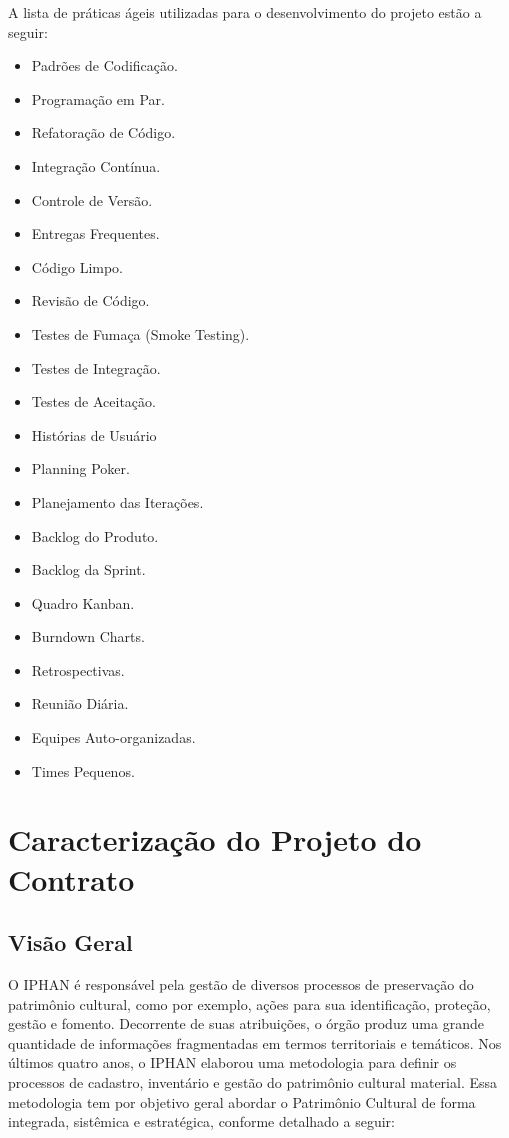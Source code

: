 A lista de práticas ágeis utilizadas para o desenvolvimento do projeto estão a seguir:
\begin{itemize}
\item Padrões de Codificação.
\item Programação em Par.
\item Refatoração de Código.
\item Integração Contínua.
\item Controle de Versão.
\item Entregas Frequentes.
\item Código Limpo.
\item Revisão de Código.
\item Testes de Fumaça (Smoke Testing).
\item Testes de Integração.
\item Testes de Aceitação.
\item Histórias de Usuário
\item Planning Poker.
\item Planejamento das Iterações.
\item Backlog do Produto.
\item Backlog da Sprint.
\item Quadro Kanban.
\item Burndown Charts.
\item Retrospectivas.
\item Reunião Diária.
\item Equipes Auto-organizadas.
\item Times Pequenos.
\end{itemize}


\section[Caracterização do Projeto Contrato]{Caracterização do Projeto do Contrato}

\subsection[Visão Geral]{Visão Geral}

O IPHAN é responsável pela gestão de diversos processos de preservação do patrimônio cultural, como por exemplo, ações para sua identificação, proteção, gestão e fomento. Decorrente
de suas atribuições, o órgão produz uma grande quantidade de informações fragmentadas em termos territoriais e temáticos. Nos últimos quatro anos, o IPHAN elaborou uma metodologia
para definir os processos de cadastro, inventário e gestão do patrimônio cultural material. Essa metodologia tem por objetivo geral abordar o Patrimônio Cultural de forma integrada, sistêmica
e estratégica, conforme detalhado a seguir:

